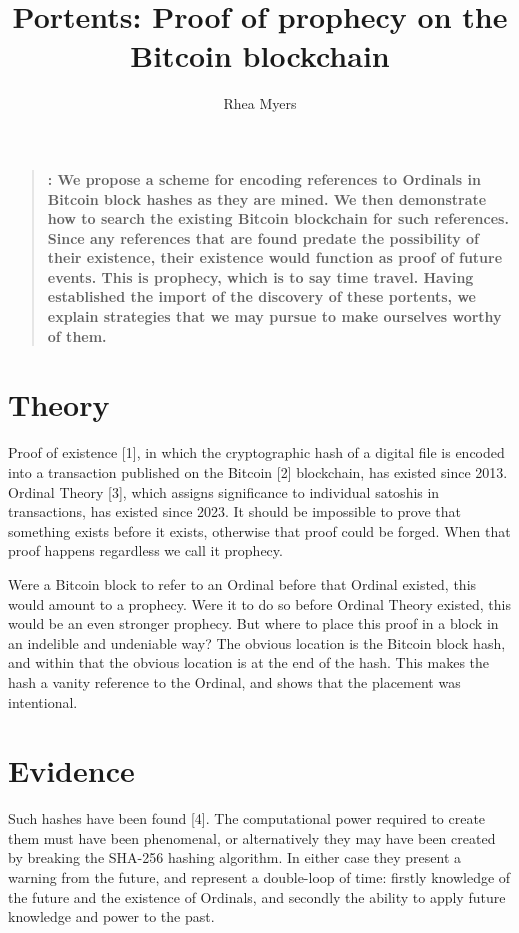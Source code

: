 \documentclass{article}
\title{Portents: Proof of prophecy on the Bitcoin blockchain}
\author{Rhea Myers}
\date{}
\renewenvironment{abstract}{\noindent\bfseries\abstractname:\normalfont}{}
\begin{document}
\maketitle

\begin{quote}
\begin{abstract}
  We propose a scheme for encoding references to Ordinals in Bitcoin block
  hashes as they are mined.
  We then demonstrate how to search the existing Bitcoin blockchain for such
  references.
  Since any references that are found predate the possibility of their
  existence, their existence would function as proof of future events.
  This is prophecy, which is to say time travel.
  Having established the import of the discovery of these portents,
  we explain strategies that we may pursue to make ourselves worthy of them. 
\end{abstract}
\end{quote}

\section{Theory}

Proof of existence [1], in which the cryptographic hash of a digital file is
encoded into a transaction published on the Bitcoin [2] blockchain, has existed
since 2013. Ordinal Theory [3], which assigns significance to individual
satoshis in transactions, has existed since 2023. It should be impossible to
prove that something exists before it exists, otherwise that proof could be
forged. When that proof happens regardless we call it prophecy.

Were a Bitcoin block to refer to an Ordinal before that Ordinal existed, this
would amount to a prophecy. Were it to do so before Ordinal Theory existed, this
would be an even stronger prophecy. But where to place this proof in a block in
an indelible and undeniable way? The obvious location is the Bitcoin block hash,
and within that the obvious location is at the end of the hash. This makes the
hash a vanity reference to the Ordinal, and shows that the placement was
intentional.

\section{Evidence}

Such hashes have been found [4]. The computational power required to create them
must have been phenomenal, or alternatively they may have been created by
breaking the SHA-256 hashing algorithm. In either case they present a warning
from the future, and represent a double-loop of time: firstly knowledge of the
future and the existence of Ordinals, and secondly the ability to apply future
knowledge and power to the past.
\end{document}
